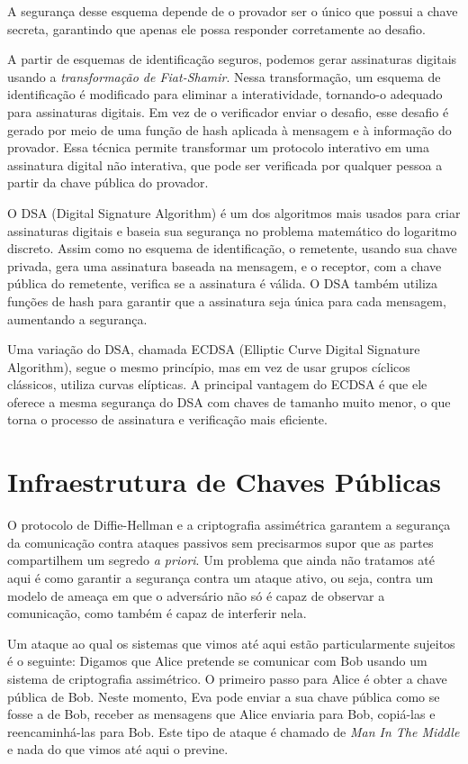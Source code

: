 A segurança desse esquema depende de o provador ser o único que possui a chave secreta, garantindo que apenas ele possa responder corretamente ao desafio.

A partir de esquemas de identificação seguros, podemos gerar assinaturas digitais usando a {\em transformação de Fiat-Shamir}.
Nessa transformação, um esquema de identificação é modificado para eliminar a interatividade, tornando-o adequado para assinaturas digitais.
Em vez de o verificador enviar o desafio, esse desafio é gerado por meio de uma função de hash aplicada à mensagem e à informação do provador.
Essa técnica permite transformar um protocolo interativo em uma assinatura digital não interativa, que pode ser verificada por qualquer pessoa a partir da chave pública do provador.

O DSA (Digital Signature Algorithm) é um dos algoritmos mais usados para criar assinaturas digitais e baseia sua segurança no problema matemático do logaritmo discreto.
Assim como no esquema de identificação, o remetente, usando sua chave privada, gera uma assinatura baseada na mensagem, e o receptor, com a chave pública do remetente, verifica se a assinatura é válida.
O DSA também utiliza funções de hash para garantir que a assinatura seja única para cada mensagem, aumentando a segurança.

Uma variação do DSA, chamada ECDSA (Elliptic Curve Digital Signature Algorithm), segue o mesmo princípio, mas em vez de usar grupos cíclicos clássicos, utiliza curvas elípticas.
A principal vantagem do ECDSA é que ele oferece a mesma segurança do DSA com chaves de tamanho muito menor, o que torna o processo de assinatura e verificação mais eficiente.

\section{Infraestrutura de Chaves Públicas}
\label{sec:pki}

O protocolo de Diffie-Hellman e a criptografia assimétrica garantem a segurança da comunicação contra ataques passivos sem precisarmos supor que as partes compartilhem um segredo {\em a priori}.
Um problema que ainda não tratamos até aqui é como garantir a segurança contra um ataque ativo, ou seja, contra um modelo de ameaça em que o adversário não só é capaz de observar a comunicação, como também é capaz de interferir nela.

Um ataque ao qual os sistemas que vimos até aqui estão particularmente sujeitos é o seguinte:
Digamos que Alice pretende se comunicar com Bob usando um sistema de criptografia assimétrico.
O primeiro passo para Alice é obter a chave pública de Bob.
Neste momento, Eva pode enviar a sua chave pública como se fosse a de Bob, receber as mensagens que Alice enviaria para Bob, copiá-las e reencaminhá-las para Bob.
Este tipo de ataque é chamado de {\em Man In The Middle} e nada do que vimos até aqui o previne.

